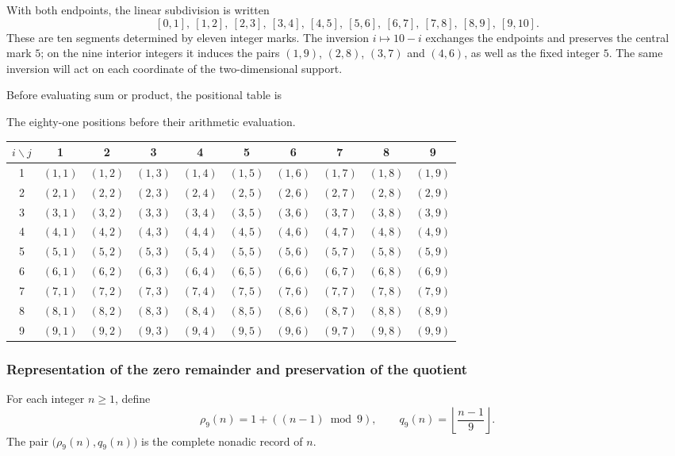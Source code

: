 With both endpoints, the linear subdivision is written
\[
 [0,1],\ [1,2],\ [2,3],\ [3,4],\ [4,5],\
 [5,6],\ [6,7],\ [7,8],\ [8,9],\ [9,10].
\]
These are ten segments determined by eleven integer marks. The inversion $i\mapsto10-i$ exchanges the endpoints and preserves the central mark $5$; on the nine interior integers it induces the pairs $(1,9)$, $(2,8)$, $(3,7)$ and $(4,6)$, as well as the fixed integer $5$. The same inversion will act on each coordinate of the two-dimensional support.

Before evaluating sum or product, the positional table is
\begin{tablacompleta}[htbp]
\caption{The eighty-one positions before their arithmetic evaluation.}
\label{tab:app-posiciones}
{\small\setlength{\tabcolsep}{3pt}
\begin{tabular}{c*{9}{c}}
\toprule
$i\backslash j$ &1&2&3&4&5&6&7&8&9\\
\midrule
1 &$(1,1)$&$(1,2)$&$(1,3)$&$(1,4)$&$(1,5)$&$(1,6)$&$(1,7)$&$(1,8)$&$(1,9)$\\
2 &$(2,1)$&$(2,2)$&$(2,3)$&$(2,4)$&$(2,5)$&$(2,6)$&$(2,7)$&$(2,8)$&$(2,9)$\\
3 &$(3,1)$&$(3,2)$&$(3,3)$&$(3,4)$&$(3,5)$&$(3,6)$&$(3,7)$&$(3,8)$&$(3,9)$\\
4 &$(4,1)$&$(4,2)$&$(4,3)$&$(4,4)$&$(4,5)$&$(4,6)$&$(4,7)$&$(4,8)$&$(4,9)$\\
5 &$(5,1)$&$(5,2)$&$(5,3)$&$(5,4)$&$(5,5)$&$(5,6)$&$(5,7)$&$(5,8)$&$(5,9)$\\
6 &$(6,1)$&$(6,2)$&$(6,3)$&$(6,4)$&$(6,5)$&$(6,6)$&$(6,7)$&$(6,8)$&$(6,9)$\\
7 &$(7,1)$&$(7,2)$&$(7,3)$&$(7,4)$&$(7,5)$&$(7,6)$&$(7,7)$&$(7,8)$&$(7,9)$\\
8 &$(8,1)$&$(8,2)$&$(8,3)$&$(8,4)$&$(8,5)$&$(8,6)$&$(8,7)$&$(8,8)$&$(8,9)$\\
9 &$(9,1)$&$(9,2)$&$(9,3)$&$(9,4)$&$(9,5)$&$(9,6)$&$(9,7)$&$(9,8)$&$(9,9)$\\
\bottomrule
\end{tabular}}
\end{tablacompleta}

\subsubsection{Representation of the zero remainder and preservation of the quotient}

\begin{definicion}
\label{def:app-residuo}
For each integer $n\geq1$, define
\begin{equation}
 \rho_9(n)=1+((n-1)\bmod9),\qquad
 q_9(n)=\left\lfloor\frac{n-1}{9}\right\rfloor.
 \label{eq:app-rho-q}
\end{equation}
The pair $\bigl(\rho_9(n),q_9(n)\bigr)$ is the complete nonadic record of $n$.
\end{definicion}

